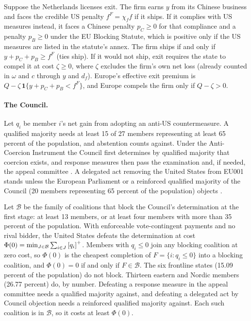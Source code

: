 \begin{remark}\label{rem:firm}
Suppose the Netherlands licenses exit. The firm earns $y$ from its Chinese business and faces the credible US penalty $f^F=\chi_f f$ if it ships. If it complies with US measures instead, it faces a Chinese penalty $p_C\ge0$ for that compliance and a penalty $p_B\ge0$ under the EU Blocking Statute, which is positive only if the US measures are listed in the statute's annex. The firm ships if and only if $y+p_C+p_B\ge f^F$ (ties ship). If it would not ship, exit requires the state to compel it at cost $\zeta\ge0$, where $\zeta$ excludes the firm's own net loss (already counted in $\omega$ and $c$ through $y$ and $d_f$). Europe's effective exit premium is $Q-\zeta\,\mathbf 1\{y+p_C+p_B<f^F\}$, and Europe compels the firm only if $Q-\zeta>0$.
\end{remark}

\paragraph{The Council.} Let $q_i$ be member $i$'s net gain from adopting an anti-US countermeasure. A qualified majority needs at least 15 of 27 members representing at least 65 percent of the population, and abstention counts against. Under the Anti-Coercion Instrument the Council first determines by qualified majority that coercion exists, and response measures then pass the examination and, if needed, the appeal committee \citep{eu2023aci, eu2011comitology}. A delegated act removing the United States from EU001 stands unless the European Parliament or a reinforced qualified majority of the Council (20 members representing 65 percent of the population) objects \citep{eu2021dualuse, eu2016tfeu}.

\begin{remark}\label{rem:council}
Let $\mathcal B$ be the family of coalitions that block the Council's determination at the first stage: at least 13 members, or at least four members with more than 35 percent of the population. With enforceable vote-contingent payments and no rival bidder, the United States defeats the determination at cost $\Phi(0)=\min_{J\in\mathcal B}\sum_{i\in J}\left[q_i\right]^{+}$. Members with $q_i\le0$ join any blocking coalition at zero cost, so $\Phi(0)$ is the cheapest completion of $F=\{i:q_i\le0\}$ into a blocking coalition, and $\Phi(0)=0$ if and only if $F\in\mathcal B$. The six frontline states (15.09 percent of the population) do not block. Thirteen eastern and Nordic members (26.77 percent) do, by number. Defeating a response measure in the appeal committee needs a qualified majority against, and defeating a delegated act by Council objection needs a reinforced qualified majority against. Each such coalition is in $\mathcal B$, so it costs at least $\Phi(0)$.
\end{remark}

